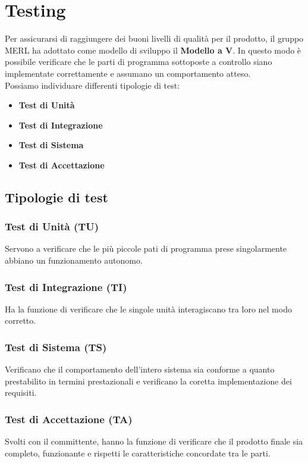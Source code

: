 \chapter{Testing}
Per assicurarsi di raggiungere dei buoni livelli di qualità per il prodotto, il gruppo MERL 
ha adottato come modello di sviluppo il \textbf{Modello a V}. In questo modo è possibile verificare 
che le parti di programma sottoposte a controllo siano implementate correttamente e assumano un 
comportamento atteso.
\\Possiamo individuare differenti tipologie di test:
    \begin{itemize}
        \item \textbf{Test di Unità}
        \item \textbf{Test di Integrazione} 
        \item \textbf{Test di Sistema}
        \item \textbf{Test di Accettazione}
        
    \end{itemize}

\section{Tipologie di test}
    \subsection{Test di Unità (TU)}  Servono a verificare che le più piccole pati di programma prese singolarmente abbiano un funzionamento autonomo.
    \subsection{Test di Integrazione (TI)} Ha la funzione di verificare che le singole unità interagiscano tra loro nel modo corretto.
    \subsection{Test di Sistema (TS)} Verificano che il comportamento dell'intero sistema sia conforme a quanto prestabilito in termini prestazionali e verificano la coretta implementazione dei requisiti.
    \subsection{Test di Accettazione (TA)} Svolti con il committente, hanno la funzione di verificare che il prodotto 
        finale sia completo, funzionante e rispetti le caratteristiche concordate tra le parti.


